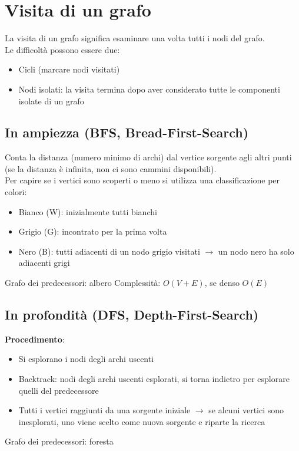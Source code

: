 \documentclass[12pt,a4paper]{article}
\begin{document}
\clearpage
\section{Visita di un grafo}
La visita di un grafo significa esaminare una volta tutti i nodi del grafo.\\
Le difficoltà possono essere due: \begin{itemize}
\item Cicli (marcare nodi visitati)
\item Nodi isolati: la visita termina dopo aver considerato tutte le componenti isolate di un grafo
\end{itemize}

\subsection{In ampiezza (BFS, Bread-First-Search)}
Conta la distanza (numero minimo di archi) dal vertice sorgente agli altri punti (se la distanza è infinita, non ci sono cammini disponibili).\\
Per capire se i vertici sono scoperti o meno si utilizza una classificazione per colori:
\begin{itemize}
\item Bianco (W): inizialmente tutti bianchi
\item Grigio (G): incontrato per la prima volta
\item Nero (B): tutti adiacenti di un nodo grigio visitati $\rightarrow$ un nodo nero ha solo adiacenti grigi
\end{itemize}
Grafo dei predecessori: albero
Complessità: $O(V+E)$, se denso $O(E)$

\subsection{In profondità (DFS, Depth-First-Search)}
\textbf{Procedimento}:
\begin{itemize}
\item Si esplorano i nodi degli archi uscenti
\item Backtrack: nodi degli archi uscenti esplorati, si torna indietro per esplorare quelli del predecessore
\item Tutti i vertici raggiunti da una sorgente iniziale $\rightarrow$ se alcuni vertici sono inesplorati, uno viene scelto come nuova sorgente e riparte la ricerca
\end{itemize}
Grafo dei predecessori: foresta
\end{document}
